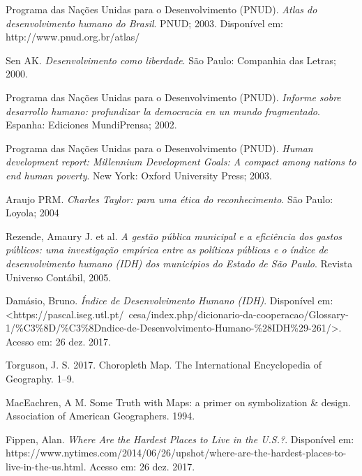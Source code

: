 \documentclass[conference]{IEEEtran}
\begin{document}
\begin{thebibliography}{1}


Programa das Nações Unidas para o Desenvolvimento (PNUD). \emph{Atlas do desenvolvimento humano do Brasil}. PNUD; 2003. Disponível em: http://www.pnud.org.br/atlas/

Sen AK. \emph{Desenvolvimento como liberdade}. São Paulo: Companhia das Letras; 2000.

Programa das Nações Unidas para o Desenvolvimento (PNUD). \emph{Informe sobre desarrollo humano: profundizar la democracia en un mundo fragmentado}. Espanha: Ediciones MundiPrensa; 2002.

Programa das Nações Unidas para o Desenvolvimento (PNUD). \emph{Human development report: Millennium Development Goals: A compact among nations to end human poverty}. New York: Oxford University Press; 2003.

Araujo PRM. \emph{Charles Taylor: para uma ética do reconhecimento}. São Paulo: Loyola; 2004

Rezende, Amaury J. et al. \emph{A gestão pública municipal e a eficiência dos gastos públicos: uma investigação empírica entre as políticas públicas e o índice de desenvolvimento humano (IDH) dos municípios do Estado de São Paulo}. Revista Universo Contábil, 2005.

Damásio, Bruno. \emph{Índice de Desenvolvimento Humano (IDH)}. Disponível em: <https://pascal.iseg.utl.pt/~cesa/index.php/dicionario-da-cooperacao/Glossary-1/\%C3\%8D/\%C3\%8Dndice-de-Desenvolvimento-Humano-\%28IDH\%29-261/>. Acesso em: 26 dez. 2017.

Torguson, J. S. 2017. Choropleth Map. The International Encyclopedia of Geography. 1–9.

MacEachren, A M. Some Truth with Maps: a primer on symbolization \& design. Association of American Geographers. 1994.

Fippen, Alan. \emph{Where Are the Hardest Places to Live in the U.S.?}. Disponível em: https://www.nytimes.com/2014/06/26/upshot/where-are-the-hardest-places-to-live-in-the-us.html. Acesso em: 26 dez. 2017.

\end{thebibliography}




\end{document}
